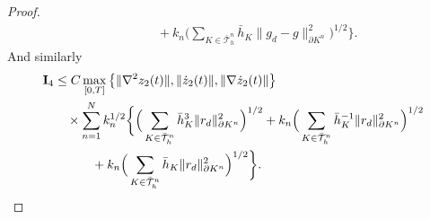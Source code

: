 \documentclass{amsart}
\numberwithin{equation}{section}
\theoremstyle{definition}
\begin{document}
\begin{proof}
\begin{equation}
\begin{split}
    &\quad\quad \quad
    +k_n
    \Big(\sum_{K\in\bar{\mathcal T}_h^n}\bar h_K\|g_d-g\|_{\partial K^n}^2
    \Big)^{1/2} \bigg\}.
  \end{split}
\end{equation}
And similarly
\begin{equation}   \label{aposteriori2:est5}
  \begin{split}
  {\rm{\bf I}}_4
    &\le C\max_{[0,T]}\big\{\|\nabla^{2}z_2(t)\|,
     \|\dot z_2(t)\|,
     \|\nabla\dot z_2(t)\|\big\}\\
    &\quad\times \sum_{n=1}^N k_n^{1/2}
    \bigg\{
    \Big(\sum_{K\in\bar{\mathcal T}_h^n}\bar h_K^{3}\|r_d\|_{\partial K^n}^2
    \Big)^{1/2}
    +k_n
    \Big(\sum_{K\in\bar{\mathcal T}_h^n}\bar h_K^{-1}\|r_d\|_{\partial K^n}^2
    \Big)^{1/2}\\
    &\quad\quad \quad
    +k_n
    \Big(\sum_{K\in\bar{\mathcal T}_h^n}\bar h_K\|r_d\|_{\partial K^n}^2
    \Big)^{1/2} \bigg\}.
  \end{split}
\end{equation}


\end{proof}
\end{document}
